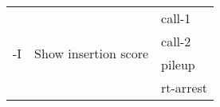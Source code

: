 {\small
\begin{tabular}{@{}p{}p{}l@{}}
\multirow{4}{=}{-I} & \multirow{4}{=}{Show insertion score} & call-1 \\
 &  & call-2 \\
 &  & pileup \\
 &  & rt-arrest \\
\end{tabular}\\
}
